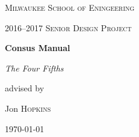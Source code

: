 \begin{titlepage}
  \pagestyle{empty}
  \centering
  {\scshape\LARGE Milwaukee School of Eningeering\par}
  \vspace{1cm}
  {\scshape\Large 2016--2017 Senior Design Project\par}
  \vspace{1.5cm}
  {\bfseries\huge Consus Manual\par}
  \vspace{2cm}
  {\itshape\Large The Four Fifths\par}

  \vfill

  advised by\par
  Jon \textsc{Hopkins}

  \vfill

  {\large \today\par}
  \cleardoublepage%
\end{titlepage}
\restoregeometry%
